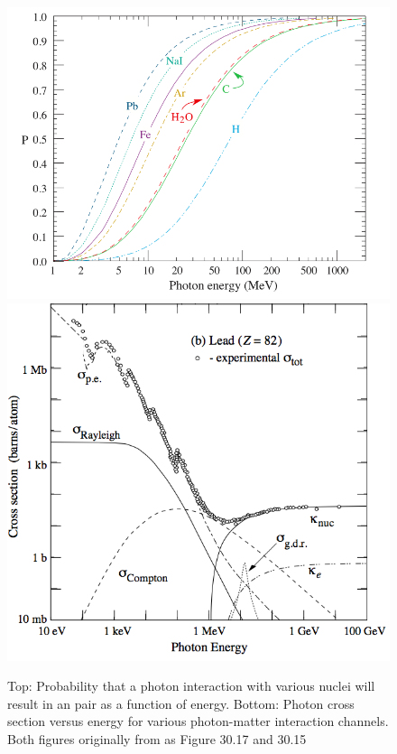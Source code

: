 \begin{figure}[!]
	\centering
	\vspace{-0.5cm}
		\includegraphics[width=0.85\columnwidth]{Figures/Beringer12_30_17.png}
		\includegraphics[width=0.85\columnwidth]{Figures/Beringer12_30_15.png}
	\caption[Top:Probability of photon conversion to e$^-$ e$^+$ pair. Bottom: Photon cross section versus energy]{Top: Probability that a photon interaction with various nuclei will result in an \ee{} pair as a function of energy. Bottom: Photon cross section versus energy for various photon-matter interaction channels. Both figures originally from \cite{Beringer12} as Figure 30.17 and 30.15 }
	\label{fig:pairProd}
\end{figure}

